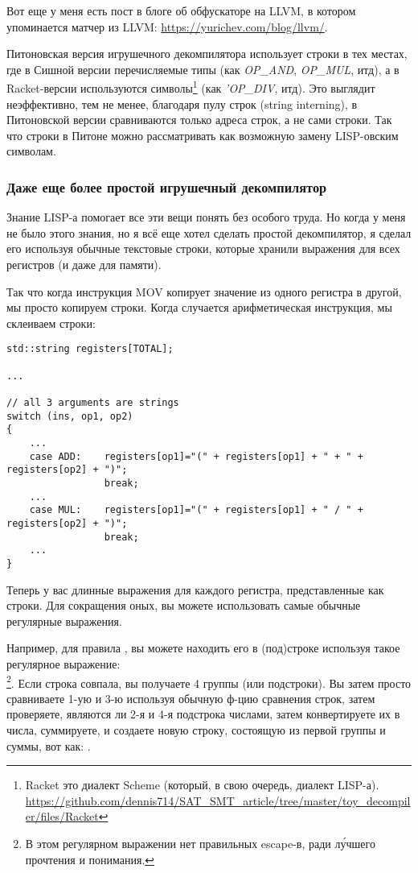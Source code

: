 Вот еще у меня есть пост в блоге об обфускаторе на LLVM, в котором упоминается матчер из LLVM:
\url{https://yurichev.com/blog/llvm/}.

Питоновская версия игрушечного декомпилятора использует строки в тех местах, где в Сишной версии перечисляемые типы
(как \textit{OP\_AND}, \textit{OP\_MUL}, итд),
а в Racket-версии используются символы\footnote{Racket это диалект Scheme (который, в свою очередь, диалект LISP-а).
\url{https://github.com/dennis714/SAT_SMT_article/tree/master/toy_decompiler/files/Racket}} (как \textit{'OP\_DIV}, итд).
Это выглядит неэффективно, тем не менее, благодаря пулу строк (string interning), в Питоновской версии сравниваются
только адреса строк, а не сами строки.
Так что строки в Питоне можно рассматривать как возможную замену LISP-овским символам.

\subsubsection{Даже еще более простой игрушечный декомпилятор}

Знание LISP-а помогает все эти вещи понять без особого труда.
Но когда у меня не было этого знания, но я всё еще хотел сделать простой декомпилятор, я сделал его используя обычные
текстовые строки, которые хранили выражения для всех регистров (и даже для памяти).

Так что когда инструкция MOV копирует значение из одного регистра в другой, мы просто копируем строки.
Когда случается арифметическая инструкция, мы склеиваем строки:

\begin{lstlisting}
std::string registers[TOTAL];

...

// all 3 arguments are strings
switch (ins, op1, op2)
{
    ...
    case ADD:    registers[op1]="(" + registers[op1] + " + " + registers[op2] + ")";
                 break;
    ...
    case MUL:    registers[op1]="(" + registers[op1] + " / " + registers[op2] + ")";
                 break;
    ...
}
\end{lstlisting}

Теперь у вас длинные выражения для каждого регистра, представленные как строки.
Для сокращения оных, вы можете использовать самые обычные регулярные выражения.

Например, для правила , вы можете находить его в (под)строке используя такое регулярное
выражение: \\
\footnote{В этом регулярном выражении нет правильных escape-в, ради л\'{у}чшего прочтения и понимания.}.
Если строка совпала, вы получаете 4 группы (или подстроки).
Вы затем просто сравниваете 1-ую и 3-ю используя обычную ф-цию сравнения строк, затем проверяете,
являются ли 2-я и 4-я подстрока числами, затем конвертируете их в числа, суммируете, и создаете новую строку, состоящую
из первой группы и суммы, вот как: .

